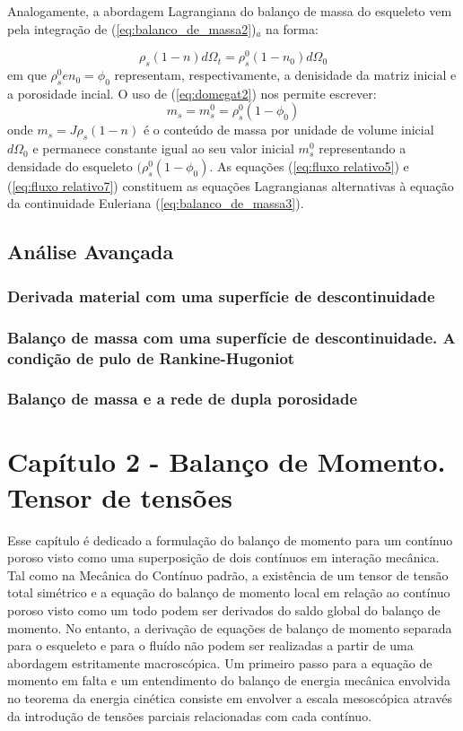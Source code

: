 \documentclass[
	11pt, %
	fleqn, %
	a4paper, %
]{LegrandOrangeBook}
\begin{document}
Analogamente, a abordagem Lagrangiana do balanço de massa do esqueleto vem pela integração de (\ref{eq:balanco_de_massa2})$_a$ na forma:

\begin{equation}
	\label{eq:fluxo relativo6}	
	\rho_s(1-n)d\Omega_t = \rho_s^0(1-n_0)d\Omega_0
\end{equation}
em que $\rho_s^0 e n_0 = \phi_0$ representam, respectivamente, a denisidade da matriz inicial e a porosidade incial. O uso de (\ref{eq:domegat2}) nos permite escrever:
\begin{equation}
	\label{eq:fluxo relativo7}	
	m_s = m_s^0 = \rho_s^0(1-\phi_0)
\end{equation}
onde $m_s = J\rho_s(1-n)$ é o conteúdo de massa por unidade de volume inicial $d\Omega_0$ e permanece constante igual ao seu valor inicial $m_s^0$ representando a densidade do esqueleto $(\rho_s^0(1-\phi_0)$. As equações (\ref{eq:fluxo relativo5}) e (\ref{eq:fluxo relativo7}) constituem as equações Lagrangianas alternativas à  equação da continuidade Euleriana (\ref{eq:balanco_de_massa3}).

\section{Análise Avançada}

\subsection{Derivada material com uma superfície de descontinuidade}
\subsection{Balanço de massa com uma superfície de descontinuidade. A condição de pulo de Rankine-Hugoniot}
\subsection{Balanço de massa e a rede de dupla porosidade}


\chapter{Capítulo 2 - Balanço de Momento. Tensor de tensões}

Esse capítulo é dedicado a formulação do balanço de momento para um contínuo poroso visto como uma superposição de dois contínuos em interação mecânica. Tal como na Mecânica do Contínuo padrão, a existência de um tensor de tensão total simétrico e a equação do balanço de momento local em relação ao contínuo poroso visto como um todo podem ser derivados do saldo global do balanço de momento. No entanto, a derivação de equações de balanço de momento separada para o esqueleto e para o fluído não podem ser realizadas a partir de uma abordagem estritamente macroscópica. Um primeiro passo para a equação de momento em falta e um entendimento do balanço de energia mecânica envolvida no teorema da energia cinética consiste em envolver a escala mesoscópica através da introdução de tensões parciais relacionadas com cada contínuo.
\end{document}
